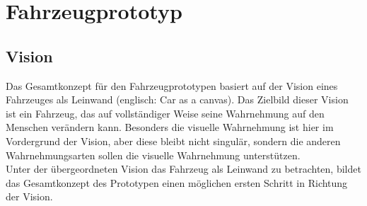 \chapter{Fahrzeugprototyp}
\label{cha:Prototyp}
\section{Vision}
Das Gesamtkonzept für den Fahrzeugprototypen basiert auf der Vision eines \glqq Fahrzeuges als Leinwand\grqq{} (englisch: \glqq Car as a canvas\grqq{}). Das Zielbild dieser Vision ist ein Fahrzeug, das auf vollständiger Weise seine Wahrnehmung auf den Menschen verändern kann. Besonders die visuelle Wahrnehmung ist hier im Vordergrund der Vision, aber diese bleibt nicht singulär, sondern die anderen Wahrnehmungsarten sollen die visuelle Wahrnehmung unterstützen.\\
Unter der übergeordneten Vision das Fahrzeug als Leinwand zu betrachten, bildet das Gesamtkonzept des Prototypen einen möglichen ersten Schritt in Richtung der Vision.
